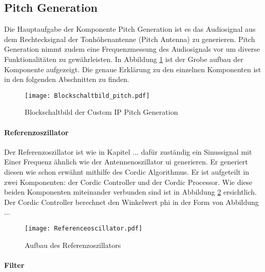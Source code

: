 \subsection{Pitch Generation}\label{subsec:Pitch_Generation}

Die Hauptaufgabe der Komponente Pitch Generation ist es das Audiosignal aus dem Rechtecksignal der Tonhöhenantenne (Pitch Antenna) zu generieren. Pitch Generation nimmt zudem eine Frequenzmessung des Audiosignals vor um diverse Funktionalitäten zu gewährleisten. In Abbildung \ref{img:Blockschaltbild_pitch} ist der Grobe aufbau der Komponente aufgezeigt. Die genaue Erklärung zu den einzelnen Komponenten ist in den folgenden Abschnitten zu finden.


\begin{figure}[h!]
	\centering
	\texttt{[image: Blockschaltbild\_pitch.pdf]}
	\caption{Blockschaltbild der Custom IP Pitch Generation} 
	\label{img:Blockschaltbild_pitch}
\end{figure}  



\paragraph{Referenzoszillator}

Der Referenzoszillator ist wie in Kapitel ...  dafür zuständig ein Sinussignal mit Einer Frequenz ähnlich wie der Antennenoszillator ui generieren. Er generiert diesen wie schon erwähnt mithilfe des Cordic Algorithmus. Er ist aufgeteilt in zwei Komponenten: der Cordic Controller und der Cordic Processor. Wie diese beiden Komponenten miteinander verbunden sind ist in Abbildung \ref{img:Referenceoscillator} ersichtlich. \\

Der Cordic Controller berechnet den Winkelwert phi in der Form von Abbildung ... 

\begin{figure}[h!]
	\centering
	\texttt{[image: Referenceoscillator.pdf]}
	\caption{Aufbau des Referenzoszillators} 
	\label{img:Referenceoscillator}
\end{figure}  


\paragraph{Filter}

